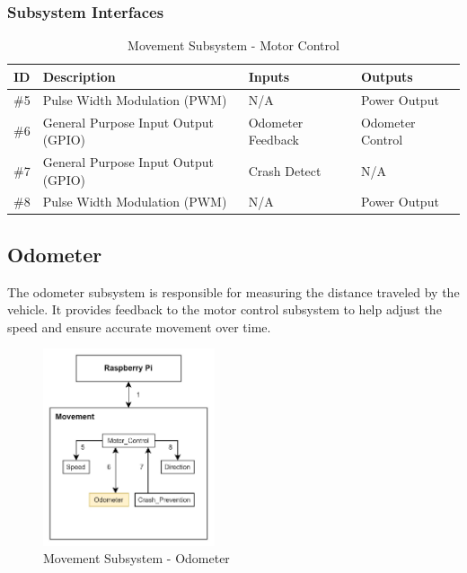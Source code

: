 \subsubsection{Subsystem Interfaces}

\begin{table}[H]
\caption{Movement Subsystem - Motor Control} 
\begin{center}
    \begin{tabular}{ | p{0.8cm} | p{6cm} | p{4cm} | p{3cm} |}
    \hline
    ID & Description & Inputs & Outputs  \\ \hline
    \#5 & Pulse Width Modulation (PWM) & N/A & Power Output \\ \hline
    \#6 & General Purpose Input Output (GPIO) & Odometer Feedback  & Odometer Control \\ \hline
    \#7 & General Purpose Input Output (GPIO) & Crash Detect & N/A \\ \hline
    \#8 & Pulse Width Modulation (PWM) & N/A & Power Output \\ \hline
    \end{tabular}
\end{center}
\end{table}

\newpage


\subsection{Odometer}
The odometer subsystem is responsible for measuring the distance traveled by the vehicle. It provides feedback to the motor control subsystem to help adjust the speed and ensure accurate movement over time.

\begin{figure}[h!]
	\centering
 	\includegraphics[width=0.45\textwidth]{images/movement/odometer.jpg}
 \caption{Movement Subsystem - Odometer} %
\end{figure}

